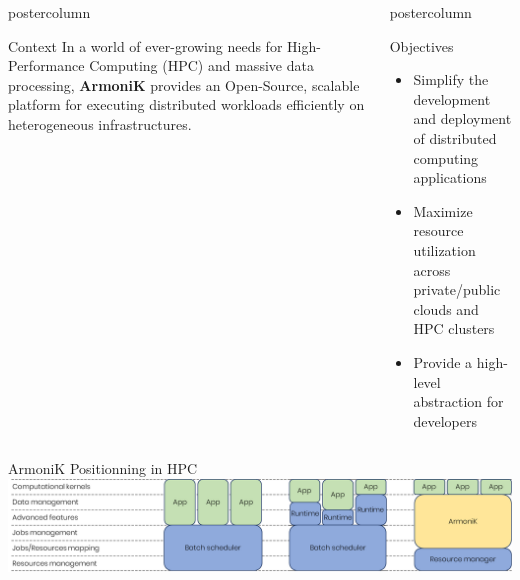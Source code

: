 \begin{frame}[fragile]

  \begin{columns}[T]
    \begin{column}{.49\textwidth}
      \begin{beamercolorbox}[center,wd=\textwidth]{postercolumn}
        \begin{minipage}[T]{.96\textwidth}
            \begin{block}{Context}
              In a world of ever-growing needs for High-Performance Computing (HPC) and massive data processing, \textbf{ArmoniK} provides an Open-Source, scalable platform for executing distributed workloads efficiently on heterogeneous infrastructures.
            \end{block}
        \end{minipage}
      \end{beamercolorbox}
      \vfill
    \end{column}
    \begin{column}{.49\textwidth}
      \begin{beamercolorbox}[center,wd=\textwidth]{postercolumn}
        \begin{minipage}[T]{.96\textwidth}
              \begin{block}{Objectives}
                \begin{itemize}
                  \item Simplify the development and deployment of distributed computing applications
                  \item Maximize resource utilization across private/public clouds and HPC clusters
                  \item Provide a high-level abstraction for developers
                \end{itemize}
              \end{block}
        \end{minipage}
      \end{beamercolorbox}
    \end{column}
  \end{columns}

  \begin{block}{ArmoniK Positionning in HPC}
    \centering
    \includegraphics[width=.85\textwidth]{hpc-orchestrators.png}            
  \end{block}


\end{frame}

